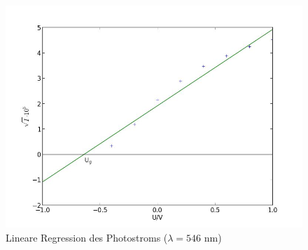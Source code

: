 	\begin{figure}[h]
		\begin{center}
		\includegraphics[scale=0.7]{picagrunlin.jpg}
		\caption{Lineare Regression des Photostroms ($\lambda=546$ nm)}
		\label{picagrunlin}
		\end{center}	
	\end{figure}